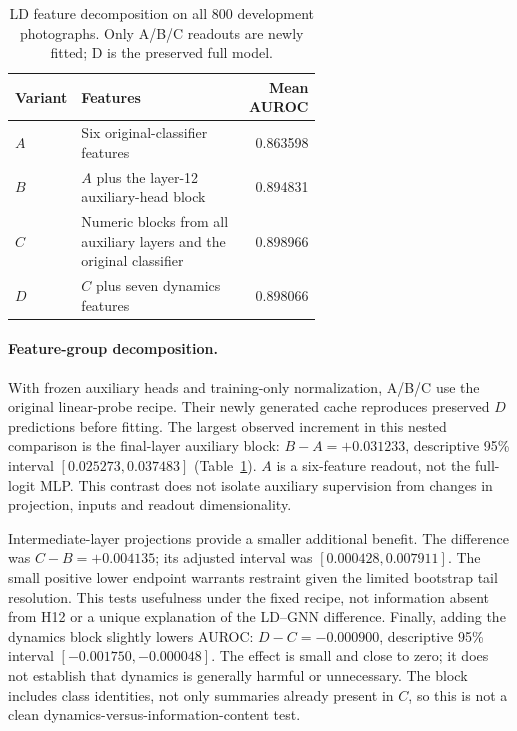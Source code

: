 \begin{table}[htbp]
\centering
\caption{LD feature decomposition on all 800 development photographs.
Only A/B/C readouts are newly fitted; D is the preserved full model.}
\label{tab:ld-decomposition}
\begin{tabular}{lp{0.61\linewidth}r}
\hline
Variant & Features & Mean AUROC\\
\hline
$A$ & Six original-classifier features & 0.863598\\
$B$ & $A$ plus the layer-12 auxiliary-head block & 0.894831\\
$C$ & Numeric blocks from all auxiliary layers and the original classifier & 0.898966\\
$D$ & $C$ plus seven dynamics features & 0.898066\\
\hline
\end{tabular}
\end{table}

\paragraph{Feature-group decomposition.}
With frozen auxiliary heads and training-only normalization, A/B/C use
the original linear-probe recipe. Their newly generated cache reproduces
preserved $D$ predictions before fitting. The largest observed increment
in this nested comparison is the final-layer auxiliary block:
$B-A=+0.031233$, descriptive 95\% interval $[0.025273,0.037483]$
(Table~\ref{tab:ld-decomposition}). $A$ is a six-feature readout, not the
full-logit MLP. This contrast does not isolate auxiliary supervision
from changes in projection, inputs and readout dimensionality.

Intermediate-layer projections provide a smaller additional benefit.
The difference was $C-B=+0.004135$; its adjusted interval was
$[0.000428,0.007911]$.
The small positive lower endpoint warrants restraint given the limited
bootstrap tail resolution. This tests usefulness under the fixed recipe,
not information absent from H12 or a unique explanation of the
LD--GNN difference. Finally, adding the dynamics block slightly lowers
AUROC: $D-C=-0.000900$, descriptive 95\% interval
$[-0.001750,-0.000048]$. The effect is small and close to zero; it
does not establish that dynamics is generally harmful or unnecessary.
The block includes class identities, not only summaries already present
in $C$, so this is not a clean dynamics-versus-information-content test.

